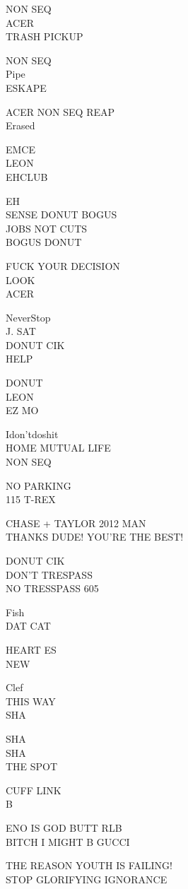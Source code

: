 \documentclass[10pt,letterpaper]{article}
\begin{document}
NON SEQ\\
ACER\\
TRASH PICKUP

NON SEQ\\
Pipe\\
ESKAPE

ACER NON SEQ REAP\\
Erased

EMCE\\
LEON\\
EHCLUB

EH\\
SENSE DONUT BOGUS\\
JOBS NOT CUTS\\
BOGUS DONUT

FUCK YOUR DECISION\\
LOOK\\
ACER

NeverStop\\
J. SAT\\
DONUT CIK\\
HELP

DONUT\\
LEON\\
EZ MO

Idon'tdoshit\\
HOME MUTUAL LIFE\\
NON SEQ

NO PARKING\\
115 T{-}REX

CHASE + TAYLOR 2012 MAN\\
THANKS DUDE! YOU'RE THE BEST!

DONUT CIK\\
DON'T TRESPASS\\
NO TRESSPASS 605

Fish\\
DAT CAT

HEART ES\\
NEW

Clef\\
THIS WAY\\
SHA

SHA\\
SHA\\
THE SPOT

CUFF LINK\\
B

ENO IS GOD BUTT RLB\\
BITCH I MIGHT B GUCCI

THE REASON YOUTH IS FAILING!\\
STOP GLORIFYING IGNORANCE
\end{document}
